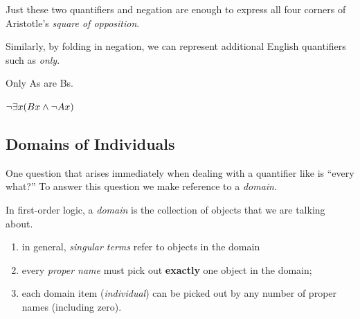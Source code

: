 \begin{definition}
  Just these two quantifiers and negation are enough to express all four corners
  of Aristotle's \emph{square of opposition}.
  \begin{center}
  \end{center}

\end{definition}

Similarly, by folding in negation, we can represent additional English
quantifiers such as \emph{only}.

\begin{argument}
\item[ ] Only As are Bs.
\item[ ] $\neg\exists x(Bx\wedge\neg Ax)$
\end{argument}


\subsection{Domains of Individuals}

One question that arises immediately when dealing with a quantifier like
\eforall is ``every what?'' To answer this question we make reference to a
\emph{domain}.

\begin{definition}
  \label{def:fol-domain-informal}
  In first-order logic, a \emph{domain} is the collection of objects that we
  are talking about.
  \begin{enumerate}
  \item in general, \emph{singular terms} refer to objects in the domain
  \item every \emph{proper name} must pick out \textbf{exactly} one object in
    the domain;
  \item each domain item (\emph{individual}) can be picked out by any number of
    proper names (including zero).
  \end{enumerate}
\end{definition}


